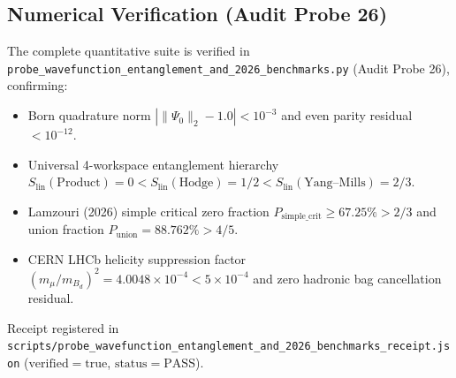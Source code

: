 \documentclass[11pt,a4paper]{article}
\begin{document}
\subsection{Numerical Verification (Audit Probe 26)}
The complete quantitative suite is verified in \texttt{probe\_wavefunction\_entanglement\_and\_2026\_benchmarks.py} (Audit Probe 26), confirming:
\begin{itemize}
  \item Born quadrature norm $|\|\Psi_0\|_2 - 1.0| < 10^{-3}$ and even parity residual $< 10^{-12}$.
  \item Universal 4-workspace entanglement hierarchy $S_{\mathrm{lin}}(\mathrm{Product}) = 0 < S_{\mathrm{lin}}(\mathrm{Hodge}) = 1/2 < S_{\mathrm{lin}}(\mathrm{Yang\text{--}Mills}) = 2/3$.
  \item Lamzouri (2026) simple critical zero fraction $P_{\mathrm{simple\_crit}} \ge 67.25\% > 2/3$ and union fraction $P_{\mathrm{union}} = 88.762\% > 4/5$.
  \item CERN LHCb helicity suppression factor $(m_\mu / m_{B_d})^2 = 4.0048 \times 10^{-4} < 5 \times 10^{-4}$ and zero hadronic bag cancellation residual.
\end{itemize}
Receipt registered in \texttt{scripts/probe\_wavefunction\_entanglement\_and\_2026\_benchmarks\_receipt.json} ($\mathrm{verified} = \mathrm{true}$, $\mathrm{status} = \mathrm{PASS}$).
\end{document}
